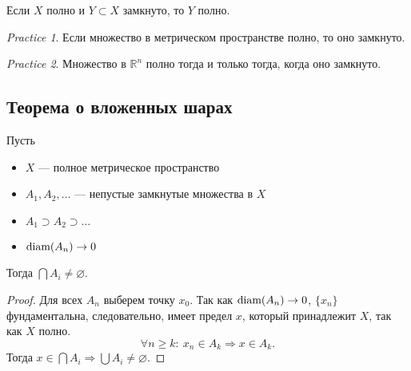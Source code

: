 \documentclass[11pt]{book}
\newcommand{\R}{\mathbb{R}}
\newcommand{\diam}{{\mathop{\text{\rm diam}}}}
\renewcommand{\ge}{\geqslant}
\theoremstyle{definition}
\theoremstyle{plain}
\theoremstyle{plain}
\theoremstyle{definition}
\theoremstyle{remark}
\newtheorem*{prac}{Practice}
\begin{document}
\begin{thm}
    Если $ X$ полно и  $ Y \subset X$ замкнуто, то $ Y$ полно.
\end{thm}
\begin{prac}
    Если множество в метрическом пространстве полно, то оно замкнуто.
\end{prac}
\begin{prac}
    Множество в $ \R^{n} $ полно тогда и только тогда, когда оно замкнуто.
\end{prac}
\subsection{Теорема о вложенных шарах}
\begin{thm}\label{th_vlo_shar}
    Пусть
    \begin{itemize}
	\item $ X$ --- полное метрическое пространство
	\item $ A_1, A_2, \ldots $ --- непустые замкнутые множества в $ X$
	\item  $ A_1 \supset A_2 \supset \ldots $
	\item $ \diam(A_n) \to  0$
    \end{itemize}
    Тогда $ \bigcap A_i \ne \varnothing $.
\end{thm}
\begin{proof}
    Для всех $ A_n$ выберем точку  $ x_0$. Так как $ \diam(A_n) \to  0$, $ \{x_{n}\}$ фундаментальна, следовательно, имеет предел $ x$, который принадлежит $ X$, так как  $ X$ полно.
    \[
	\forall n \ge k: ~ x_{n} \in A_k \Longrightarrow x \in  A_k
    .\]
    Тогда $ x \in  \bigcap A_i  \Longrightarrow \bigcup A_i \ne \varnothing$.
\end{proof}
\end{document}
